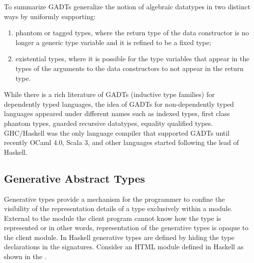 \documentclass[screen,nonacm,manuscript,review]{acmart} %
\begin{document}
To summarize GADTs generalize the notion of algebraic datatypes in two
distinct ways by uniformly supporting:
\begin{enumerate}
\item phantom or tagged types, where the return type of the data
  constructor is no longer a generic type variable and it is refined
  to be a fixed type;
\item existential types, where it is possible for the type variables
  that appear in the types of the arguments to the data
  constructors to not appear in the return type.
\end{enumerate}

While there is a rich literature of GADTs (inductive type families)
for dependently typed languages\cite{dybjer_inductive_1991,
  dybjer_inductive_1994}, the idea of GADTs for non-dependently typed
languages appeared under different names such as indexed
types\cite{zenger_indexed_1997}, first class phantom
types\cite{cheney_first-class_2003}, guarded recursive
datatypes\cite{xi_guarded_2003}, equality qualified
types\cite{sheard_meta-programming_2008}. GHC/Haskell was the only
language compiler that supported GADTs\cite{peyton_jones_wobbly_2004}
until recently OCaml 4.0\cite{garrigue_gadt_2011}, Scala 3\cite{xu_implementing_2021},
and other languages started following the lead of Haskell.


\subsection{Generative Abstract Types}\label{subsubsec:gen-abs-types}
Generative types provide a mechanism for the programmer to confine the
visibility of the representation details of a type
exclusively within a module. External to the module the client program
cannot know how the type is represented or in other words,
representation of the generative types is opaque to the client
module. In Haskell generative types are defined by hiding the type
declarations in the signatures. Consider an HTML module defined in
Haskell as shown in the .
\end{document}
